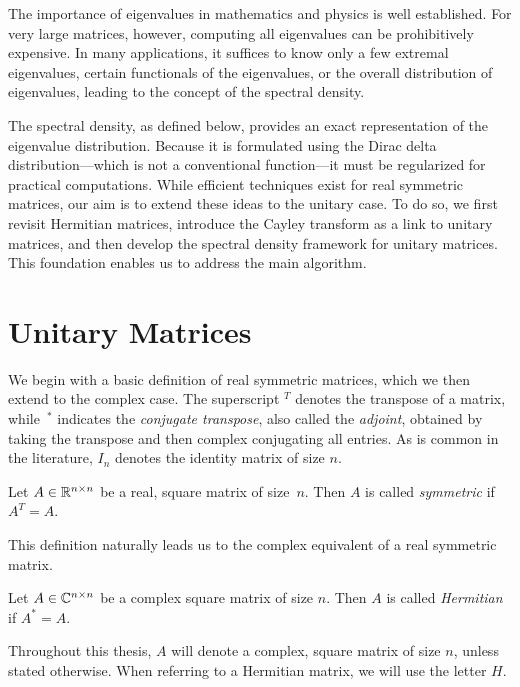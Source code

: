 The importance of eigenvalues in mathematics and physics is well established. For very large matrices, however, computing all eigenvalues can be prohibitively expensive. In many applications, it suffices to know only a few extremal eigenvalues, certain functionals of the eigenvalues, or the overall distribution of eigenvalues, leading to the concept of the spectral density.

The spectral density, as defined below, provides an exact representation of the eigenvalue distribution. Because it is formulated using the Dirac delta distribution—which is not a conventional function—it must be regularized for practical computations. While efficient techniques exist for real symmetric matrices, our aim is to extend these ideas to the unitary case. To do so, we first revisit Hermitian matrices, introduce the Cayley transform as a link to unitary matrices, and then develop the spectral density framework for unitary matrices. This foundation enables us to address the main algorithm.

\section{Unitary Matrices}

We begin with a basic definition of real symmetric matrices, which we then extend to the complex case. The superscript $^T$ denotes the transpose of a matrix, while~$^*$ indicates the \emph{conjugate transpose}, also called the \emph{adjoint}, obtained by taking the transpose and then complex conjugating all entries. As is common in the literature, $I_n$ denotes the identity matrix of size $n$.

\begin{definition}
    Let $A \in \mathbb{R}^{n \times n}$ be a real, square matrix of size~$n$. Then $A$ is called \emph{symmetric} if $A^T = A$.
\end{definition}

This definition naturally leads us to the complex equivalent of a real symmetric matrix.

\begin{definition}
    Let $A \in \mathbb{C}^{n \times n}$ be a complex square matrix of size $n$. Then $A$ is called \emph{Hermitian} if $A^* = A$.
\end{definition}

Throughout this thesis, $A$ will denote a complex, square matrix of size $n$, unless stated otherwise. When referring to a Hermitian matrix, we will use the letter $H$.

